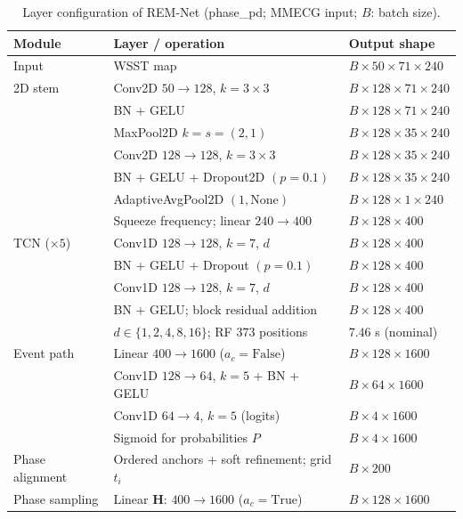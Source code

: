 \begin{table}[!t]
\centering
\caption{Layer configuration of REM-Net (phase\_pd; MMECG input; $B$: batch size).}
\label{tab:layers}
\begin{threeparttable}
\scriptsize
\setlength{\tabcolsep}{2pt}
\renewcommand{\arraystretch}{1.08}
\begin{tabular}{@{}lll@{}}
\toprule
Module & Layer / operation & Output shape \\
\midrule
Input & WSST map & $B\times50\times71\times240$ \\
2D stem & Conv2D $50\to128$, $k=3\times3$ & $B\times128\times71\times240$ \\
 & BN + GELU & $B\times128\times71\times240$ \\
 & MaxPool2D $k=s=(2,1)$ & $B\times128\times35\times240$ \\
 & Conv2D $128\to128$, $k=3\times3$ & $B\times128\times35\times240$ \\
 & BN + GELU + Dropout2D $(p=0.1)$ & $B\times128\times35\times240$ \\
 & AdaptiveAvgPool2D $(1,\mathrm{None})$ & $B\times128\times1\times240$ \\
 & Squeeze frequency; linear $240\to400$ & $B\times128\times400$ \\
\addlinespace[2pt]
TCN ($\times5$) & Conv1D $128\to128$, $k=7$, $d$ & $B\times128\times400$ \\
 & BN + GELU + Dropout $(p=0.1)$ & $B\times128\times400$ \\
 & Conv1D $128\to128$, $k=7$, $d$ & $B\times128\times400$ \\
 & BN + GELU; block residual addition & $B\times128\times400$ \\
 & $d\in\{1,2,4,8,16\}$; RF $373$ positions & $7.46$ s (nominal) \\
\addlinespace[2pt]
Event path & Linear $400\to1600$ ($a_c=\mathrm{False}$) & $B\times128\times1600$ \\
 & Conv1D $128\to64$, $k=5$ + BN + GELU & $B\times64\times1600$ \\
 & Conv1D $64\to4$, $k=5$ (logits) & $B\times4\times1600$ \\
 & Sigmoid for probabilities $P$ & $B\times4\times1600$ \\
\addlinespace[2pt]
Phase alignment & Ordered anchors + soft refinement; grid $t_i$ & $B\times200$ \\
Phase sampling & Linear $\mathbf H$: $400\to1600$ ($a_c=\mathrm{True}$) & $B\times128\times1600$ \\

\end{tabular}
\end{threeparttable}
\end{table}
